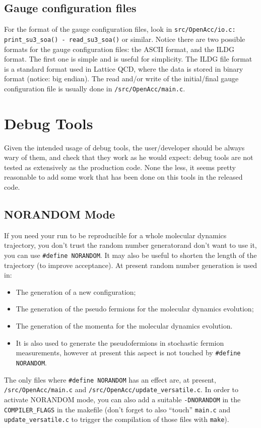 \subsection{Gauge configuration files}
For the format of the gauge configuration files, look in 
\verb|src/OpenAcc/io.c: print_su3_soa() - read_su3_soa()| or similar.
Notice there are two possible formats for the gauge configuration files: the 
ASCII format, and the ILDG format. The first one is simple and is useful for 
simplicity. The ILDG file format is a standard format used in Lattice QCD, 
where the data is stored in binary format (notice: big endian).  
The read and/or write of the initial/final gauge configuration file
is usually done in \verb|/src/OpenAcc/main.c|.


\section{Debug Tools}
Given the intended usage of debug tools, the user/developer should be always 
wary of them, and check that they work as he would expect: debug tools are not 
tested as extensively as the production code. None the less, it seems pretty
reasonable to add some work that has been done on this tools in the released 
code.
\subsection{ NORANDOM Mode}
If you need your run to be reproducible for a whole molecular dynamics 
trajectory, you don't trust the random number generatorand don't want to use 
it, you can use
\verb|#define NORANDOM|. It may also be useful to shorten the length of the 
trajectory (to improve acceptance).
At present random number generation is used in:
\begin{itemize}
    \item The generation of a new configuration;
    \item The generation of the pseudo fermions for the molecular dynamics 
        evolution;
    \item The generation of the momenta for the molecular dynamics evolution.
    \item It is also used to generate the pseudofermions in stochastic fermion 
        measurements, however at present this aspect is not touched by 
        \verb|#define NORANDOM|.
\end{itemize}
The only files where \verb|#define NORANDOM| has an effect are, at present, 
\verb|/src/OpenAcc/main.c| and \verb|/src/OpenAcc/update_versatile.c|. In order 
to activate NORANDOM mode, you can also add a suitable \verb|-DNORANDOM| in the 
\verb|COMPILER_FLAGS| in the makefile (don't forget to also ``touch'' 
\verb|main.c| and \verb|update_versatile.c| to trigger the compilation of those 
files with \verb|make|).



